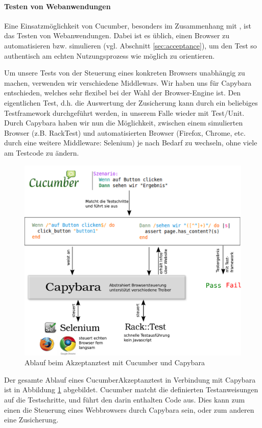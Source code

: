 \paragraph{Testen von Webanwendungen}
Eine Einsatzmöglichkeit von Cucumber, besonders im Zusammenhang mit , ist das Testen von Webanwendungen. Dabei ist es üblich, einen Browser zu automatisieren bzw. simulieren (vgl. Abschnitt \ref{sec:acceptance}), um den Test so authentisch am echten Nutzungsprozess wie möglich zu orientieren. 

Um unsere Tests von der Steuerung eines konkreten Browsers unabhängig zu machen, verwenden wir verschiedene Middlewars. Wir haben uns für Capybara entschieden, welches sehr flexibel bei der Wahl der Browser-Engine ist. Den eigentlichen Test, d.h. die Auswertung der Zusicherung kann durch ein beliebiges Testframework durchgeführt werden, in unserem Falle wieder mit Test/Unit. Durch Capybara haben wir nun die Möglichkeit, zwischen einem simulierten Browser (z.B. RackTest) und automatisierten Browser (Firefox, Chrome, etc. durch eine weitere Middleware: Selenium) je nach Bedarf zu wechseln, ohne viele am Testcode zu ändern.
\begin{figure}[htbp]
 \centering
 \includegraphics[width=\linewidth]{./diagrams/cucumber.pdf}
 \caption{Ablauf beim Akzeptanztest mit Cucumber und Capybara}
 \label{fig:cucumber}
\end{figure}

Der gesamte Ablauf eines CucumberAkzeptanztest in Verbindung mit Capybara ist in Abbildung \ref{fig:cucumber} abgebildet. Cucumber matcht die definierten Testanweisungen auf die Testschritte, und führt den darin enthalten Code aus. Dies kann zum einen die Steuerung eines Webbrowsers durch Capybara sein, oder zum anderen eine Zusicherung.
